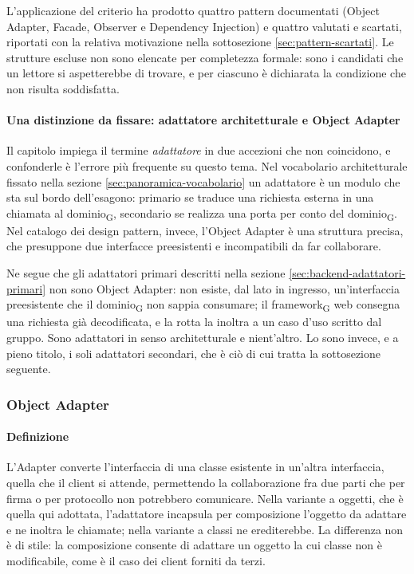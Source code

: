 \documentclass[a4paper, 10pt]{article}
\begin{document}
L'applicazione del criterio ha prodotto quattro pattern documentati (Object Adapter, Facade, Observer e Dependency Injection) e quattro valutati e scartati, riportati con la relativa motivazione nella sottosezione \ref{sec:pattern-scartati}. Le strutture escluse non sono elencate per completezza formale: sono i candidati che un lettore si aspetterebbe di trovare, e per ciascuno è dichiarata la condizione che non risulta soddisfatta.

\paragraph{Una distinzione da fissare: adattatore architetturale e Object Adapter}
Il capitolo impiega il termine \textit{adattatore} in due accezioni che non coincidono, e confonderle è l'errore più frequente su questo tema. Nel vocabolario architetturale fissato nella sezione \ref{sec:panoramica-vocabolario} un adattatore è un modulo che sta sul bordo dell'esagono: primario se traduce una richiesta esterna in una chiamata al dominio\textsubscript{G}, secondario se realizza una porta per conto del dominio\textsubscript{G}. Nel catalogo dei design pattern, invece, l'Object Adapter è una struttura precisa, che presuppone due interfacce preesistenti e incompatibili da far collaborare.

Ne segue che gli adattatori primari descritti nella sezione \ref{sec:backend-adattatori-primari} non sono Object Adapter: non esiste, dal lato in ingresso, un'interfaccia preesistente che il dominio\textsubscript{G} non sappia consumare; il framework\textsubscript{G} web consegna una richiesta già decodificata, e la rotta la inoltra a un caso d'uso scritto dal gruppo. Sono adattatori in senso architetturale e nient'altro. Lo sono invece, e a pieno titolo, i soli adattatori secondari, che è ciò di cui tratta la sottosezione seguente.

\subsubsection{Object Adapter}
\label{sec:pattern-adapter}

\paragraph{Definizione}
L'Adapter converte l'interfaccia di una classe esistente in un'altra interfaccia, quella che il client si attende, permettendo la collaborazione fra due parti che per firma o per protocollo non potrebbero comunicare. Nella variante a oggetti, che è quella qui adottata, l'adattatore incapsula per composizione l'oggetto da adattare e ne inoltra le chiamate; nella variante a classi ne erediterebbe. La differenza non è di stile: la composizione consente di adattare un oggetto la cui classe non è modificabile, come è il caso dei client forniti da terzi.
\end{document}
